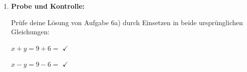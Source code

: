 \begin{enumerate}[label=\arabic*., resume]
    \vspace{1cm}

    \item \textbf{Probe und Kontrolle:}
    \vspace{0.5cm}

    Prüfe deine Lösung von Aufgabe 6a) durch Einsetzen in beide ursprünglichen Gleichungen:

    $x + y = 9 + 6 =$ \underline{\hspace{2cm}} $\checkmark$

    $x - y = 9 - 6 =$ \underline{\hspace{2cm}} $\checkmark$

\end{enumerate}